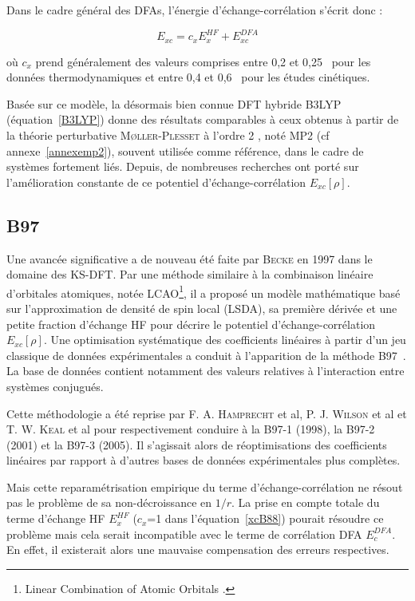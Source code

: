 {{Dans le cadre général des DFAs, l'énergie d'échange-corrélation s'écrit donc :

\begin{equation}
E_{xc} = c_{x}E_{x}^{HF} + E_{xc}^{DFA}
\label{xcB88}
\end{equation}

\noindent où $c_{x}$ prend généralement des valeurs comprises entre 0,2 et 0,25~\cite{becke1993density} pour les données thermodynamiques et entre 0,4 et 0,6~\cite{boese2004development} pour les études cinétiques.

Basée sur ce modèle, la désormais bien connue DFT hybride B3LYP \cite{becke1993density} (équation~\ref{B3LYP}) donne des résultats comparables à ceux obtenus à partir de la théorie perturbative \textsc{M\o ller-Plesset} à l'ordre 2 \cite{moller1934note}, noté MP2 (cf annexe~\ref{annexemp2}), souvent utilisée comme référence, dans le cadre de systèmes fortement liés. Depuis, de nombreuses recherches ont porté sur l'amélioration constante de ce potentiel d'échange-corrélation $E_{xc}[\rho]$.

\subsection{B97}

Une avancée significative a de nouveau été faite par \textsc{Becke} en 1997 dans le domaine des KS-DFT. Par une méthode similaire à la combinaison linéaire d'orbitales atomiques, notée LCAO\footnote{\og Linear Combination of Atomic Orbitals \fg{}.}, il a proposé un modèle mathématique basé sur l'approximation de densité de spin local (LSDA), sa première dérivée et une petite fraction d'échange HF pour décrire le potentiel d'échange-corrélation $E_{xc}[\rho]$. Une optimisation systématique des coefficients linéaires à partir d'un jeu classique de données expérimentales a conduit à l'apparition de la méthode B97~\cite{becke1997density}. La base de données contient notamment des valeurs relatives à l'interaction entre systèmes conjugués.

Cette méthodologie a été reprise par F. A. \textsc{Hamprecht} et al, P. J. \textsc{Wilson} et al et T. W. \textsc{Keal} et al pour respectivement conduire à la B97-1 \cite{hamprecht1998development} (1998), la B97-2 \cite{wilson2001hybrid} (2001) et la B97-3 \cite{keal2005semiempirical} (2005). Il s'agissait alors de réoptimisations des coefficients linéaires par rapport à d'autres bases de données expérimentales plus complètes.

Mais cette reparamétrisation empirique du terme d'échange-corrélation ne résout pas le problème de sa non-décroissance en $1/r$. La prise en compte totale du terme d'échange HF $E_{x}^{HF}$ ($c_{x}$=1 dans l'équation~\ref{xcB88}) pourait résoudre ce problème mais cela serait incompatible avec le terme de corrélation DFA $E_{c}^{DFA}$. En effet, il existerait alors une mauvaise compensation des erreurs respectives.

}}
